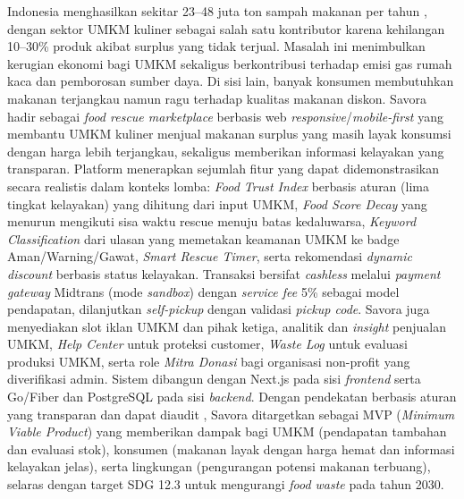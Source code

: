 Indonesia menghasilkan sekitar 23--48 juta ton sampah makanan per tahun \cite{bps2024lingkungan}\cite{indonesiapolicy2025}, dengan sektor UMKM kuliner sebagai salah satu kontributor karena kehilangan 10--30\% produk akibat surplus yang tidak terjual. Masalah ini menimbulkan kerugian ekonomi bagi UMKM sekaligus berkontribusi terhadap emisi gas rumah kaca dan pemborosan sumber daya. Di sisi lain, banyak konsumen membutuhkan makanan terjangkau namun ragu terhadap kualitas makanan diskon. Savora hadir sebagai \textit{food rescue marketplace} berbasis web \textit{responsive}/\textit{mobile-first} yang membantu UMKM kuliner menjual makanan surplus yang masih layak konsumsi dengan harga lebih terjangkau, sekaligus memberikan informasi kelayakan yang transparan. Platform menerapkan sejumlah fitur yang dapat didemonstrasikan secara realistis dalam konteks lomba: \textit{Food Trust Index} berbasis aturan (lima tingkat kelayakan) yang dihitung dari input UMKM, \textit{Food Score Decay} yang menurun mengikuti sisa waktu rescue menuju batas kedaluwarsa, \textit{Keyword Classification} dari ulasan yang memetakan keamanan UMKM ke badge Aman/Warning/Gawat, \textit{Smart Rescue Timer}, serta rekomendasi \textit{dynamic discount} berbasis status kelayakan. Transaksi bersifat \textit{cashless} melalui \textit{payment gateway} Midtrans (mode \textit{sandbox}) dengan \textit{service fee} 5\% sebagai model pendapatan, dilanjutkan \textit{self-pickup} dengan validasi \textit{pickup code}. Savora juga menyediakan slot iklan UMKM dan pihak ketiga, analitik dan \textit{insight} penjualan UMKM, \textit{Help Center} untuk proteksi customer, \textit{Waste Log} untuk evaluasi produksi UMKM, serta role \textit{Mitra Donasi} bagi organisasi non-profit yang diverifikasi admin. Sistem dibangun dengan Next.js pada sisi \textit{frontend} serta Go/Fiber dan PostgreSQL pada sisi \textit{backend}. Dengan pendekatan berbasis aturan yang transparan dan dapat diaudit \cite{kusumawati2025mobile}, Savora ditargetkan sebagai MVP (\textit{Minimum Viable Product}) yang memberikan dampak bagi UMKM (pendapatan tambahan dan evaluasi stok), konsumen (makanan layak dengan harga hemat dan informasi kelayakan jelas), serta lingkungan (pengurangan potensi makanan terbuang), selaras dengan target SDG 12.3 \cite{unsdg2024}\cite{fao2024state} untuk mengurangi \textit{food waste} pada tahun 2030.

